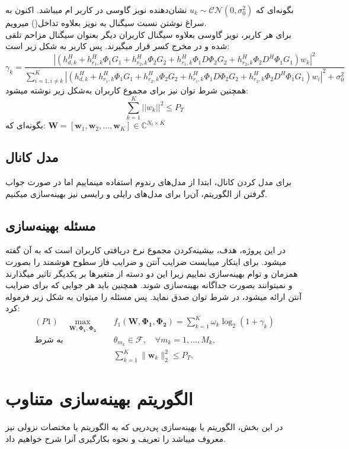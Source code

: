 بگونه‌ای که $u_k \sim \mathcal{CN}(0, \sigma_0^2)$ نشان‌دهنده نویز گاوسی در کاربر  ام میباشد.
\newpage
اکنون به سراغ نوشتن نسبت سیگنال به نویز بعلاوه تداخل() میرویم.\\
برای هر کاربر، نویز گاوسی بعلاوه سیگنال کاربران دیگر بعنوان سیگنال مزاحم تلقی شده و در مخرج کسر قرار میگیرند. پس  کاربر  به شکل زیر است:
\[
\gamma_k = \frac{{\left|\left(h_{d,k}^H + h_{r_1,k}^H \Phi_1 G_1 + h_{r_2,k}^H \Phi_2 G_2 + h_{r_1,k}^H \Phi_1 D \Phi_2 G_2 + h_{r_2,k}^H \Phi_2 D^H \Phi_1 G_1 \right)w_k\right|^2}}{{\sum_{i=1,i\neq k}^{K} \left|\left(h_{d,k}^H + h_{r_1,k}^H \Phi_1 G_1 + h_{r_2,k}^H \Phi_2 G_2 + h_{r_1,k}^H \Phi_1 D \Phi_2 G_2 + h_{r_2,k}^H \Phi_2 D^H \Phi_1 G_1 \right)w_i\right|^2 + \sigma^2_0}}
\]
همچنین شرط توان نیز برای مجموع کاربران به‌شکل زیر نوشته میشود:
\[
\sum_{k=1}^{K} ||w_k||^2 \leq P_T
\]
بگونه‌ای که:
$\mathbf{W} = [\mathbf{w}_1, \mathbf{w}_2, \ldots, \mathbf{w}_K] \in \mathbb{C}^{N_t \times K}$

\subsection{مدل کانال}
برای مدل کردن کانال، ابتدا از مدل‌های رندوم استفاده مینماییم اما در صورت جواب گرفتن از الگوریتم، آن‌را برای مدل‌های رایلی و رایسی نیز بهینه‌سازی میکنیم.

\subsection{مسئله بهینه‌سازی}
در این پروژه، هدف، بیشینه‌کردن مجموع نرخ دریافتی کاربران است که به آن  گفته میشود. برای اینکار میبایست ضرایب آنتن و ضرایب فاز سطوح هوشمند را بصورت همزمان و توام بهینه‌سازی نماییم زیرا این دو دسته از متغیرها بر یکدیگر تاثیر میگذارند و نمیتوانند بصورت جداگانه بهینه‌سازی شوند. همچنین باید هر جوابی که برای ضرایب آنتن ارائه میشود، در شرط توان صدق نماید. پس مسئله را میتوان به شکل زیر فرموله کرد:
\begin{align*}
	(P1) \quad \max_{\mathbf{W}, \boldsymbol{\Phi_1}, \boldsymbol{\Phi_2}} \quad & f_1(\mathbf{W}, \boldsymbol{\Phi_1}, \boldsymbol{\Phi_2}) = \sum_{k=1}^{K} \omega_k \log_2(1 + \gamma_k) \\
	\text{به شرط} \quad & \theta_{m_k} \in \mathcal{F}, \quad \forall m_k = 1, \ldots, M_k, \tag{4-2} \\
	& \sum_{k=1}^{K} \| \mathbf{w}_k \|_2^2 \leq P_T,
\end{align*}

\section{الگوریتم بهینه‌سازی متناوب}
در این بخش، الگوریتم  یا بهینه‌سازی پی‌در‌پی که به الگوریتم  یا مختصات نزولی نیز معروف میباشد را تعریف و نحوه بکارگیری آنرا شرح خواهیم داد.
